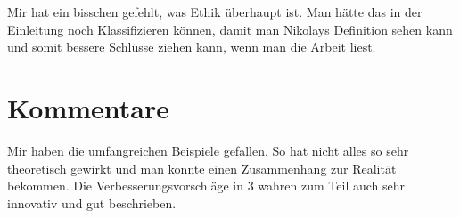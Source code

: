 \documentclass{article}
\begin{document}
Mir hat ein bisschen gefehlt, was Ethik überhaupt ist. Man hätte das in der Einleitung noch Klassifizieren können, damit man Nikolays Definition sehen kann und somit bessere Schlüsse ziehen kann, wenn man die Arbeit liest.

\section{Kommentare}

Mir haben die umfangreichen Beispiele gefallen. So hat nicht alles so sehr theoretisch gewirkt und man konnte einen Zusammenhang zur Realität bekommen.
Die Verbesserungsvorschläge in 3 wahren zum Teil auch sehr innovativ und gut beschrieben.
\end{document}
